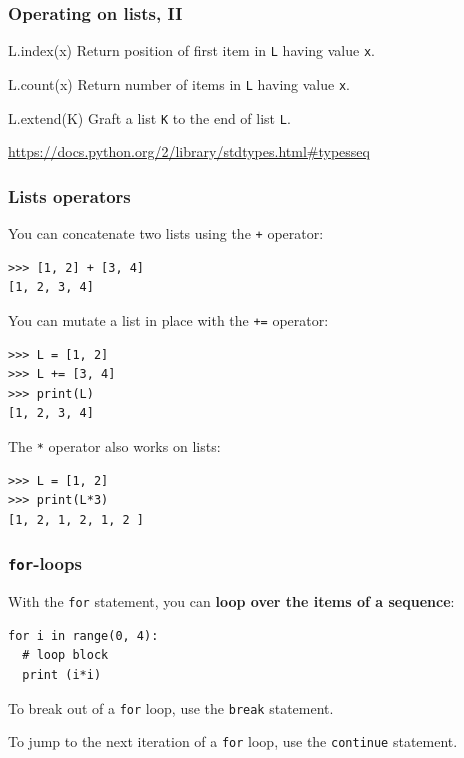 \documentclass[english,serif,mathserif,xcolor=pdftex,dvipsnames,table]{beamer}
\begin{document}
\begin{frame}[fragile]
  \frametitle{Operating on lists, II}

  \begin{describe}{L.index(x)}
    Return position of first item in \texttt{L} having value \texttt{x}.
  \end{describe}

  \begin{describe}{L.count(x)}
    Return number of items in \texttt{L} having value \texttt{x}.
  \end{describe}

  \begin{describe}{L.extend(K)}
    Graft a list \texttt{K} to the end of list \texttt{L}.
  \end{describe}

  \begin{references}
    \url{https://docs.python.org/2/library/stdtypes.html#typesseq}
  \end{references}
\end{frame}


\begin{frame}[fragile]
  \frametitle{Lists operators}
  You can concatenate two lists using the \texttt{+} operator:
  \begin{lstlisting}
>>> [1, 2] + [3, 4]
[1, 2, 3, 4]
  \end{lstlisting}

  \+
  You can mutate a list in place with the \texttt{+=} operator:
  \begin{lstlisting}
>>> L = [1, 2]
>>> L += [3, 4]
>>> print(L)
[1, 2, 3, 4]
  \end{lstlisting}

\+
The \texttt{*} operator also works on lists:
  \begin{lstlisting}
>>> L = [1, 2]
>>> print(L*3)
[1, 2, 1, 2, 1, 2 ]
  \end{lstlisting}
\end{frame}


\begin{frame}[fragile]
  \frametitle{\texttt{for}-loops}
    With the  \texttt{for} statement, you can \textbf{loop over the items of
    a sequence}:
\begin{lstlisting}
for i in range(0, 4):
  # loop block
  print (i*i)
\end{lstlisting}

  \+
  To break out of a \texttt{for} loop, use the \texttt{break}
  statement.

  \+
  To jump to the next iteration of a \texttt{for} loop, use the
  \texttt{continue} statement.
\end{frame}
\end{document}
